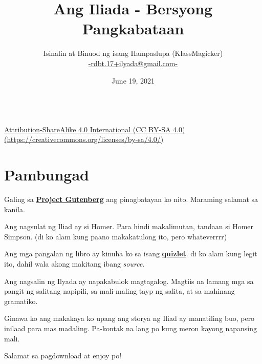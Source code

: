 \documentclass[12pt,letterpaper]{report}
\begin{document}
\title{\textbf{Ang Iliada - Bersyong Pangkabataan}}
\author{Isinalin at Binuod ng isang Hampaslupa (KlassMagicker) \\ \href{mailto:rdbt.17+ilyada@gmail.com}{-rdbt.17+ilyada@gmail.com-}}
\date{June 19, 2021}
\maketitle
\pagebreak

\vspace*{\fill}
\begin{center}
    \href{https://creativecommons.org/licenses/by-sa/4.0/}{\ccbysa \\[0.5cm] Attribution-ShareAlike 4.0 International (CC BY-SA 4.0) \\ (https://creativecommons.org/licenses/by-sa/4.0/)}

\end{center}
\vspace*{\fill}

\pagebreak
\tableofcontents
\pagebreak
\setlength{\parskip}{0.5em}
\chapter*{Pambungad}
\begin{center}

    Galing sa \href{https://www.gutenberg.org/}{\textbf{Project Gutenberg}} ang pinagbatayan ko nito. Maraming salamat sa kanila.

    Ang nagsulat ng Iliad ay si Homer. Para hindi makalimutan, tandaan si Homer Simpson. (di ko alam kung paano makakatulong ito, pero whateverrrr)

    Ang mga pangalan ng libro ay kinuha ko sa isang \href{https://quizlet.com/24340225/titles-of-each-book-in-the-iliad-flash-cards/}{\textbf{quizlet}}.     di ko alam kung legit ito, dahil wala akong makitang ibang \textit{source}.

    Ang nagsalin ng Ilyada ay napakabulok magtagalog. Magtiis na lamang mga sa pangit ng salitang napipili, sa mali-maling tayp ng salita, at sa mahinang gramatiko.

    Ginawa ko ang makakaya ko upang ang storya ng Iliad ay manatiling buo, pero inilaad para mas madaling. Pa-kontak na lang po kung meron kayong napansing mali.

    Salamat sa pagdownload at enjoy po!
    \vspace*{\fill}
\end{center}
\pagebreak
{}
\end{document}
